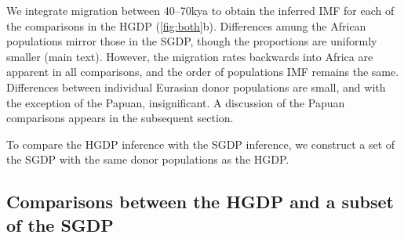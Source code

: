 \documentclass{article}
\begin{document}
We integrate migration between 40--70kya to obtain the inferred IMF for each of the comparisons in the HGDP (\ref{fig:both}b). Differences amung the African populations mirror those in the SGDP, though the proportions are uniformly smaller (main text). However, the migration rates backwards into Africa are apparent in all comparisons, and the order of populations IMF remains the same. Differences between individual Eurasian donor populations are small, and with the exception of the Papuan, insignificant. A discussion of the Papuan comparisons appears in the subsequent section.  

To compare the HGDP inference with the SGDP inference, we construct a set of the SGDP with the same donor populations as the HGDP.






\subsection{Comparisons between the HGDP and a subset of the SGDP}
\end{document}
